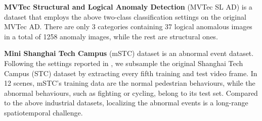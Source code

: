 \documentclass[default,iicol]{sn-jnl}\usepackage[algo2e,ruled,linesnumbered]{algorithm2e}
\theoremstyle{thmstyleone}\newtheorem{theorem}{Theorem}\newtheorem{proposition}[theorem]{Proposition}
\theoremstyle{thmstyletwo}\newtheorem{example}{Example}\newtheorem{remark}{Remark}
\theoremstyle{thmstylethree}\newtheorem{definition}{Definition}
\begin{document}
\textbf{MVTec Structural and Logical Anomaly Detection} (MVTec SL AD) \cite{MVTECLOCO} is a dataset that employs the above two-class classification settings on the original MVTec AD.
There are only 3 categories containing 37 logical anomalous images in a total of 1258 anomaly images, while the rest are structural ones.

\textbf{Mini Shanghai Tech Campus} (mSTC) \cite{mSTC} dataset is an abnormal event dataset.
Following the settings reported in \cite{CAVGA-R,Padim,patchcore}, we subsample the original Shanghai Tech Campus (STC) dataset by extracting every fifth training and test video frame.
In 12 scenes, mSTC's training data are the normal pedestrian behaviours, while the abnormal behaviours, such as fighting or cycling, belong to its test set.
Compared to the above industrial datasets, localizing the abnormal events is a long-range spatiotemporal challenge.
\end{document}
